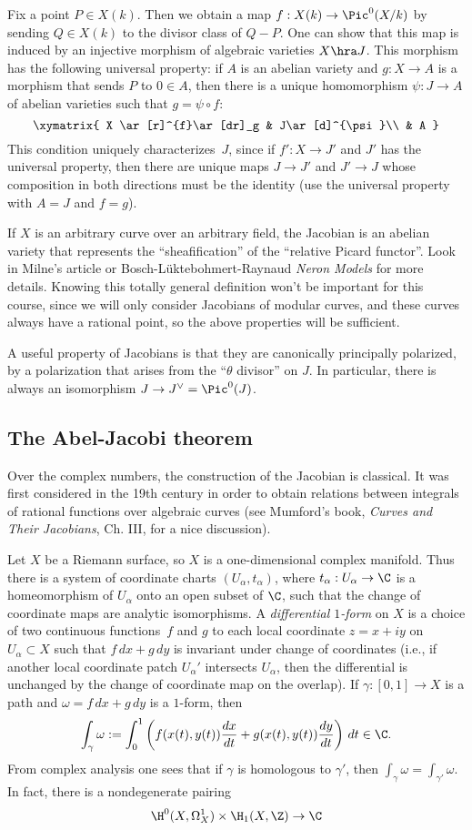 \documentclass{report}
\begin{document}
Fix a point $P\in X(k)$.  Then we obtain a map $f:X(k)\to
\Pic^0(X/k)$ by sending $Q\in X(k)$ to the divisor class of $Q-P$.
One can show that this map is induced by an injective morphism of
algebraic varieties $X\hra J$.  This morphism has the following
universal property: if $A$ is an abelian variety and $g:X\to A$ is
a morphism that sends $P$ to $0\in A$, then there is a unique
homomorphism $\psi:J\to A$ of abelian varieties such that
$g=\psi\circ f$:
\[
\xymatrix{
 X \ar[r]^{f}\ar[dr]_g & J\ar[d]^{\psi}\\
      & A
 }
\]
This condition uniquely characterizes~$J$, since if $f':X\to J'$
and $J'$ has the universal property, then there are unique maps
$J\to J'$ and $J'\to J$ whose composition in both directions must
be the identity (use the universal property with $A=J$ and $f=g$).

If $X$ is an arbitrary curve over an arbitrary field, the Jacobian
is an abelian variety that represents the ``sheafification'' of
the ``relative Picard functor''.  Look in Milne's article or
Bosch-L\"uktebohmert-Raynaud {\em Neron Models} for more details.
Knowing this totally general definition won't be important for
this course, since we will only consider Jacobians of modular
curves, and these curves always have a rational point, so the
above properties will be sufficient.

A useful property of Jacobians is that they are canonically
principally polarized, by a polarization that arises from the
``$\theta$ divisor'' on $J$.  In particular, there is always an
isomorphism $J\to J^{\vee}=\Pic^0(J)$.

\subsection{The Abel-Jacobi theorem}
Over the complex numbers, the construction of the Jacobian is
classical.  It was first considered in the 19th century in order
to obtain relations between integrals of rational functions over
algebraic curves (see Mumford's book, {\em Curves and Their
Jacobians}, Ch. III, for a nice discussion).

Let $X$ be a Riemann surface, so $X$ is a one-dimensional complex
manifold.  Thus there is a system of coordinate charts $(U_\alpha,
t_\alpha)$, where $t_\alpha:U_\alpha\to \C$ is a homeomorphism of
$U_\alpha$ onto an open subset of $\C$, such that the change of
coordinate maps are analytic isomorphisms.  A {\em differential
$1$-form} on $X$ is a choice of two continuous functions~$f$ and
$g$ to each local coordinate $z=x+iy$ on $U_\alpha\subset X$ such
that $f \,dx + g\,dy$ is invariant under change of coordinates
(i.e., if another local coordinate patch $U_\alpha'$ intersects
$U_\alpha$, then the differential is unchanged by the change of
coordinate map on the overlap).  If $\gamma:[0,1]\to X$ is a path
and $\omega=f\,dx + g\,dy$ is a $1$-form, then
\[
  \int_{\gamma} \omega :=
  \int_{0}^{1} \left( f(x(t),y(t)) \frac{dx}{dt} +  g(x(t),y(t))\frac{dy}{dt}\right)\, dt \in \C.
\]
From complex analysis one sees that if $\gamma$ is homologous to
$\gamma'$, then $\int_\gamma \omega = \int_{\gamma'}\omega$.  In
fact, there is a nondegenerate pairing
\[
   \H^0(X,\Omega^1_{X}) \times \H_1(X,\Z) \to \C
\]
\end{document}
